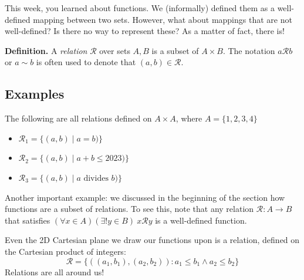 \documentclass{article}
\begin{document}
    This week, you learned about functions. We (informally) defined them as a well-defined mapping between two sets. However, what about mappings that are not well-defined? Is there no way to represent these? As a matter of fact, there is!
    
    \vspace{3mm}
    \textbf{Definition.} A \textit{relation} $\mathcal{R}$ over sets $A, B$ is a subset of $A \times B$. The notation $a\mathcal{R}b$ or $a \sim b$ is often used to denote that $(a, b) \in \mathcal{R}$.

    \subsection*{Examples}
    
    The following are all relations defined on $A \times A$, where $A = \{1, 2, 3, 4\}$
        \begin{itemize}
            \item $\mathcal{R}_1 = \{(a, b) \mid a = b)\}$
            \item $\mathcal{R}_2 = \{(a, b) \mid a+b \le 2023)\}$
            \item $\mathcal{R}_3 = \{(a, b) \mid a \text{ divides } b)\}$
        \end{itemize}
        Another important example: we discussed in the beginning of the section how functions are a subset of relations. To see this, note that any relation $\mathcal{R} \colon A \rightarrow B$ that satisfies $(\forall x \in A)(\exists! y \in B) \ x \mathcal{R}y$ is a well-defined function.

        \vspace{2mm}
        Even the 2D Cartesian plane we draw our functions upon is a relation, defined on the Cartesian product of integers:
    $$\mathcal{R} = \{((a_{1}, b_{1}), (a_{2}, b_{2})) : a_{1} \le b_{1} \land  a_{2} \le b_{2}\}$$
        Relations are all around us!
    
\end{document}
